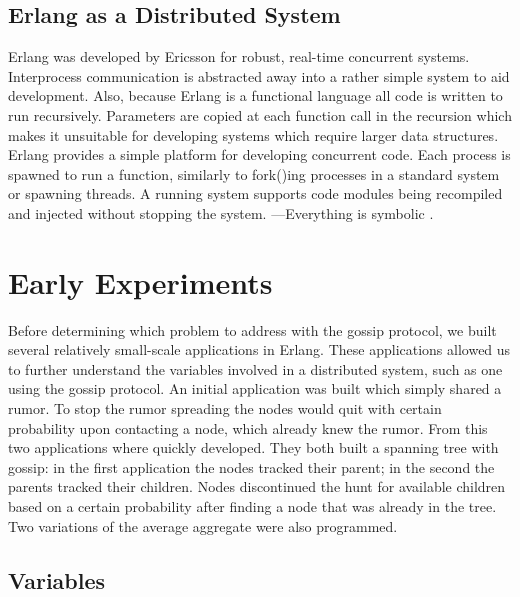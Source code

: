 \documentclass[11pt,twocolumn]{article}
\begin{document}
\subsection{Erlang as a Distributed System}

Erlang was developed by Ericsson for robust, real-time concurrent systems.  Interprocess communication is abstracted away into a rather simple system to aid development.  Also, because Erlang is a functional language all code is written to run recursively.  Parameters are copied at each function call in the recursion which makes it unsuitable for developing systems which require larger data structures.  Erlang provides a simple platform for developing concurrent code.  Each process is spawned to run a function, similarly to fork()ing processes in a standard system or spawning threads.  A running system supports code modules being recompiled and injected without stopping the system.  ---Everything is symbolic \cite{Erlang}.

\section{Early Experiments}

Before determining which problem to address with the gossip protocol, we built several relatively small-scale applications in Erlang.  These applications allowed us to further understand the variables involved in a distributed system, such as one using the gossip protocol.  An initial application was built which simply shared a rumor.  To stop the rumor spreading the nodes would quit with certain probability upon contacting a node, which already knew the rumor.  From this two applications where quickly developed.  They both built a spanning tree with gossip: in the first application the nodes tracked their parent; in the second the parents tracked their children.  Nodes discontinued the hunt for available children based on a certain probability after finding a node that was already in the tree.  Two variations of the average aggregate were also programmed.

\subsection{Variables}
\end{document}
